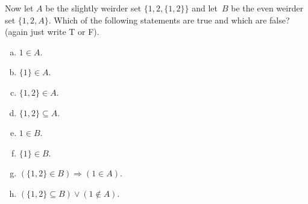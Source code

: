Now let $A$ be the slightly weirder set $\{1,2,\{1,2\}\}$ and let~$B$ be the even weirder set $\{1,2,A\}$. Which of the following statements are true and which are false? (again just write T or F).
\begin{multicols}{2}
\begin{enumerate}[(a)]
\item $1\in A$. 
\item $\{1\}\in A$.
\item $\{1,2\}\in A$.
\item $\{1,2\}\subseteq A$.
\item $1\in B$.
\item $\{1\}\in B$.
\item $(\{1,2\}\in B)\Rightarrow(1\in A)$.
\item $(\{1,2\}\subseteq B)\vee(1\not\in A).$
\end{enumerate}
\end{multicols}

